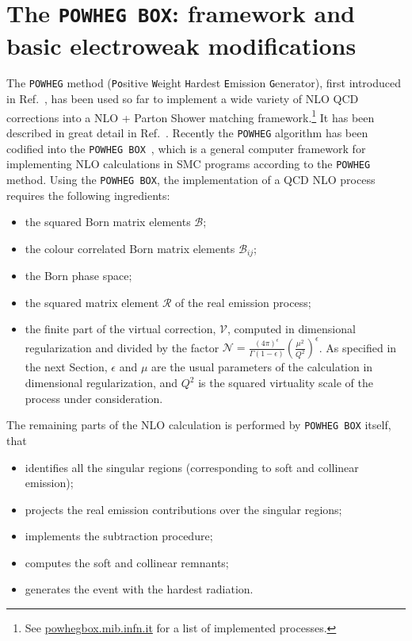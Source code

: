 \documentclass[11pt,a4paper]{article}
\newcommand\POWHEGBOX{\texttt{POWHEG BOX}}
\begin{document}
\section{The \POWHEGBOX{}: framework and basic electroweak modifications}
\label{sec:powheg}
The \texttt{POWHEG} method (\texttt{Po}sitive \texttt{W}eight
\texttt{H}ardest \texttt{E}mission \texttt{G}enerator), first
introduced in Ref.~\cite{Nason:2004rx}, has been used so far to implement a
wide variety of NLO QCD corrections into a NLO + Parton Shower matching
framework.\footnote{See \url{powhegbox.mib.infn.it} for a list of
  implemented processes.} It has been described in great detail in
Ref.~\cite{Frixione:2007vw}. Recently the \texttt{POWHEG} algorithm
has been codified into the \POWHEGBOX{}~\cite{Alioli:2010xd},
which is a general computer framework for implementing NLO
calculations in SMC programs according to the \texttt{POWHEG} method.
Using the \POWHEGBOX{}, the implementation of a QCD NLO process requires
the following ingredients:
\begin{itemize}
	\item the squared Born matrix elements $\mathcal{B}$;
	\item the colour correlated Born matrix elements $\mathcal{B}_{ij}$;
	\item the Born phase space;
	\item the squared matrix element $\mathcal{R}$ of the real emission process;
	\item the finite part of the virtual correction, $\mathcal{V}$, computed in dimensional regularization 
		  and divided by the factor $\mathcal{N}=\frac{(4\pi)^\epsilon}{\Gamma(1-\epsilon)}\left(\frac{\mu^2}{Q^2}\right)^\epsilon$. 
		  As specified in the next Section, $\epsilon$ and $\mu$ are the usual parameters of the calculation in dimensional
		  regularization, and $Q^2$ is the squared virtuality scale of the process under consideration.
\end{itemize}
The remaining parts of the NLO calculation is performed by \POWHEGBOX{} itself, that
\begin{itemize}
    \item identifies all the singular regions (corresponding to soft and collinear emission);
    \item projects the real emission contributions over the singular regions;
    \item implements the subtraction procedure;
    \item computes the soft and collinear remnants;
    \item generates the event with the hardest radiation.
\end{itemize}
\end{document}
